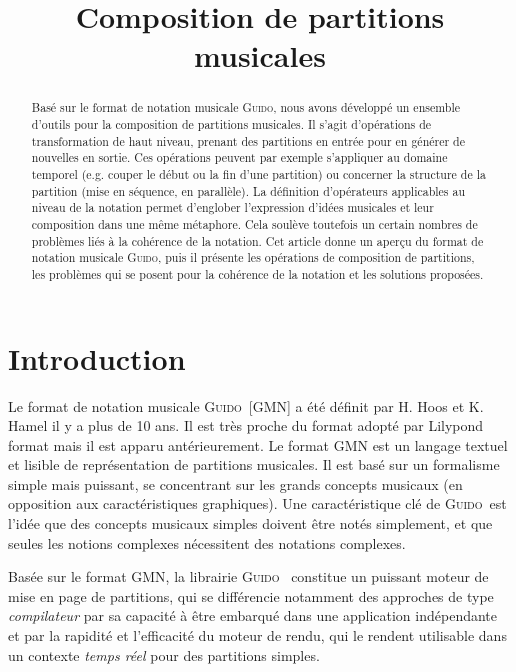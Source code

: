 \documentclass{article}
\title{Composition de partitions musicales}
\newcommand{\Guido}		{\textsc{Guido}}
\begin{document}
%
\maketitle
%
\begin{abstract}
Basé sur le format de notation musicale \Guido , nous avons développé un ensemble d'outils pour la composition de partitions musicales. Il s'agit d'opérations de transformation de haut niveau, prenant des partitions en entrée pour en générer de nouvelles  en sortie. Ces opérations peuvent par exemple s'appliquer au domaine temporel (e.g. couper le début ou la fin d'une partition) ou concerner la structure de la partition (mise en séquence, en parallèle).
La définition d'opérateurs applicables au niveau de la notation permet d'englober l'expression d'idées musicales et leur composition dans une même métaphore. Cela soulève toutefois un certain nombres de problèmes liés à la cohérence de la notation.
Cet article donne un aperçu du format de notation musicale \Guido , puis il présente les opérations de composition de partitions, les problèmes qui se posent pour la cohérence de la notation et les solutions proposées.
\end{abstract}

\section{Introduction}\label{sec:intro}
Le format de notation musicale \Guido\ [GMN] \cite{hoos98} \cite{guido} a été définit par H. Hoos et K. Hamel il y a plus de 10 ans.
Il est très proche du format adopté par Lilypond format\cite{lilypond03} \cite{lilypond06} mais il est apparu antérieurement.
Le format GMN est un langage textuel et lisible de représentation de partitions musicales. Il est basé sur un formalisme simple mais puissant, se concentrant sur les grands concepts musicaux (en opposition aux caractéristiques graphiques). Une caractéristique clé de \Guido\ est l'idée que des concepts musicaux simples doivent être notés simplement, et que seules les notions complexes nécessitent des notations complexes.

Basée sur le format GMN, la librairie \Guido\ \cite{daudin09a,Fober:04b} constitue un puissant moteur de mise en page de partitions, qui se différencie notamment des approches de type \emph{compilateur}  \cite{lilypond03,musixtex} par sa capacité à être embarqué dans une application indépendante et par la rapidité et l'efficacité du moteur de rendu, qui le rendent utilisable dans un contexte \emph{temps réel} pour des partitions simples.
\end{document}
